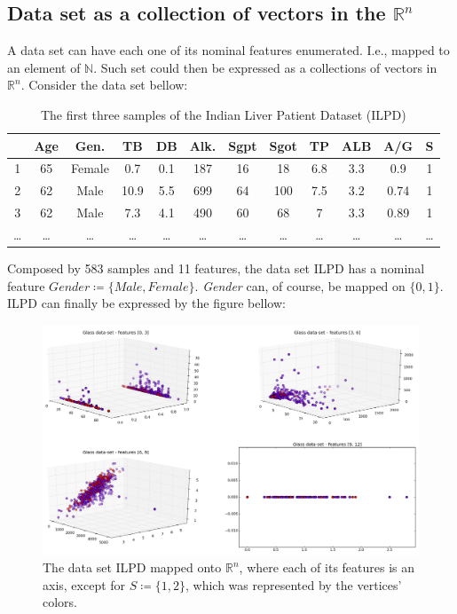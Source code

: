 \documentclass[12pt]{report}
\begin{document}
\subsection{Data set as a collection of vectors in the $\mathbb{R}^n$}

A data set can have each one of its nominal features enumerated. I.e., mapped to an element of $\mathbb{N}$. Such set could then be expressed as a collections of vectors in $\mathbb{R}^n$.
Consider the data set bellow:

\begin{table}[H]
	\begin{tabular}{ c | *{11}{|c}| }
		& \textbf{Age}
		& \textbf{Gen.}
		& \textbf{TB}
		& \textbf{DB}
		& \textbf{Alk.}
		& \textbf{Sgpt}
		& \textbf{Sgot}
		& \textbf{TP}
		& \textbf{ALB}
		& \textbf{A/G}
		& \textbf{S} \\
		 & 65 & Female & 0.7 & 0.1 & 187 & 16 & 18 & 6.8 & 3.3 & 0.9 & 1 \\
		2 & 62 & Male & 10.9 & 5.5 & 699 & 64 & 100 & 7.5 & 3.2 & 0.74 & 1 \\
		3 & 62 & Male & 7.3 & 4.1 & 490 & 60 & 68 & 7 & 3.3 & 0.89 & 1\\
		… & … & … & … & … & … & … & … & … & … & … & … \\
	\end{tabular}

	\caption{The first three samples of the Indian Liver Patient Dataset (ILPD)}
\end{table}

Composed by 583 samples and 11 features, the data set ILPD has a nominal feature $Gender \coloneqq \{Male, Female\}$. {\em Gender} can, of course, be mapped on $\{0, 1\}$. ILPD can finally be expressed by the figure bellow:

\begin{figure}[H]
	\centering
	\captionsetup{justification=centering}

	\includegraphics[scale=.3]{experiments/3_1_2_displaying_ilpd}
	\caption{The data set ILPD mapped onto $\mathbb{R}^n$, where each of its features is an axis, except for $S \coloneqq \{1, 2\}$, which was represented by the vertices' colors.}
	\label{fig:disp_ilpd}
\end{figure}
\end{document}
